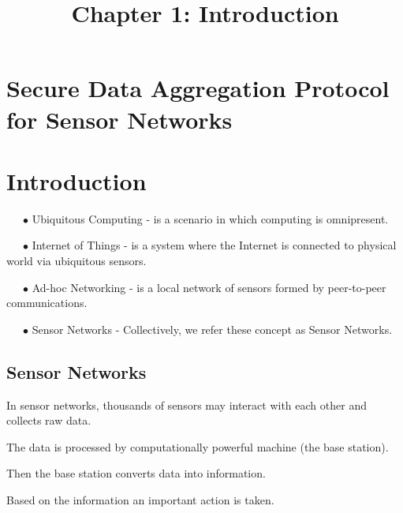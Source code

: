 \documentclass[%
  slidesonly,%
  semlayer%
  ]{seminar}                                  %
\title{Chapter 1: Introduction}
\author{}
\date{}
\date{}
\newcommand{\mybul}{{\textcolor{white}{XX}}$\bullet$ }
\begin{document}


\maketitle          %

\begin{slide}
  \ifslidesonly              %
    \addtocounter{slide}{-1}
  \fi
\end{slide}


\begin{slide}

\footnotesize

\section*{Secure Data Aggregation Protocol for Sensor Networks}
  \clearpage

\section*{Introduction}
  \mybul Ubiquitous Computing - is a scenario in which computing is omnipresent.

  \mybul Internet of Things - is a system where the Internet is connected to physical world via ubiquitous sensors.
  
  \mybul Ad-hoc Networking - is a local network of sensors formed by peer-to-peer communications.
  
  \mybul Sensor Networks - Collectively, we refer these concept as Sensor Networks.
  
  \clearpage

  \subsection*{Sensor Networks}
    In sensor networks, thousands of sensors may interact with each other and collects raw data.

    The data is processed by computationally powerful machine (the base station).

    Then the base station converts data into information.

    Based on the information an important action is taken.


\end{slide}
\end{document}
